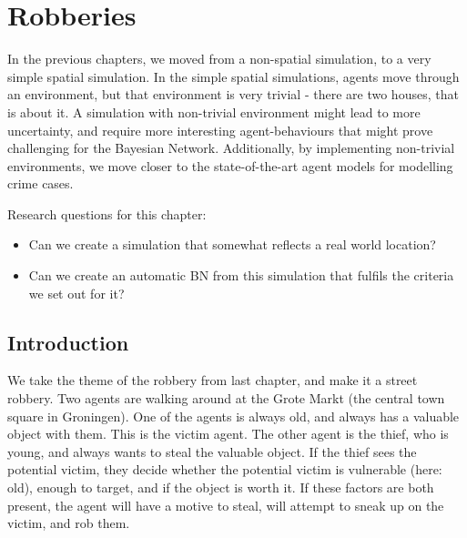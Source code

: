  

\chapter[Robberies in ``real'' locations]{Robberies}

In the previous chapters, we moved from a non-spatial simulation, to a very simple spatial simulation. In the simple spatial simulations, agents move through an environment, but that environment is very trivial - there are two houses, that is about it. A simulation with non-trivial environment might lead to more uncertainty, and require more interesting agent-behaviours that might prove challenging for the Bayesian Network. Additionally, by implementing non-trivial environments, we move closer to the state-of-the-art agent models for modelling crime cases.


Research questions for this chapter:

\begin{itemize}
\item Can we create a simulation that somewhat reflects a real world location?
\item Can we create an automatic BN from this simulation that fulfils the criteria we set out for it?
\end{itemize}



\section{Introduction}
We take the theme of the robbery from last chapter, and make it a street robbery. Two agents are walking around at the Grote Markt (the central town square in Groningen). One of the agents is always old, and always has a valuable object with them. This is the victim agent. The other agent is the thief, who is young, and always wants to steal the valuable object. If the thief sees the potential victim, they decide whether the potential victim is vulnerable (here: old), enough to target, and if the object is worth it. If these factors are both present, the agent will have a motive to steal, will attempt to sneak up on the victim, and rob them.

